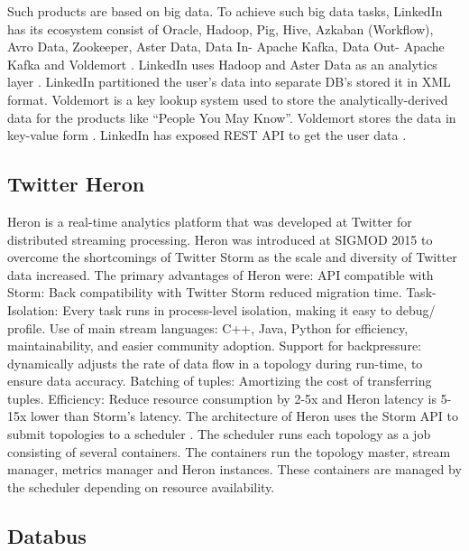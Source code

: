      Such products are based on big data. To achieve such big data
     tasks, LinkedIn has its ecosystem consist of Oracle, Hadoop, Pig,
     Hive, Azkaban (Workflow), Avro Data, Zookeeper, Aster Data,
     Data In- Apache Kafka, Data Out- Apache Kafka and Voldemort
     \cite{www-linkedinbigdata}. LinkedIn uses Hadoop and Aster Data
     as an analytics layer \cite{www-linkedinquora}. LinkedIn
     partitioned the user’s data into separate DB’s stored it in XML
     format. Voldemort is a key lookup system used to store the
     analytically-derived data for the products like ``People You
     May Know''. Voldemort stores the data in key-value form
     \cite{www-linkedinquora}. LinkedIn has exposed REST
     API to get the user data \cite{www-linkedindevelopers}.

\subsection{Twitter Heron \cv}

     Heron is a real-time analytics platform that was developed at
     Twitter for distributed streaming processing. Heron was
     introduced at SIGMOD 2015 to overcome the shortcomings of Twitter
     Storm as the scale and diversity of Twitter data increased.
     The primary advantages of Heron were: API compatible with Storm:
      Back compatibility with
     Twitter Storm reduced migration time\cite{www-TwitterHeronOpen}.
     Task-Isolation: Every task
     runs in process-level isolation, making it easy to debug/
     profile. Use of main stream languages: C++, Java, Python for
     efficiency, maintainability, and easier community
     adoption. Support for backpressure: dynamically adjusts the rate
     of data flow in a topology during run-time, to ensure data
     accuracy. Batching of tuples: Amortizing the cost of transferring
     tuples. Efficiency: Reduce resource consumption by 2-5x and Heron
     latency is 5-15x lower than Storm’s latency. The architecture of
     Heron uses the Storm API to
     submit topologies to a scheduler \cite{www-TwitterHeron}.
     The scheduler runs each
     topology as a job consisting of several containers. The
     containers run the topology master, stream manager, metrics
     manager and Heron instances. These containers are managed by the
     scheduler depending on resource availability.

     \pv

\subsection{Databus}

